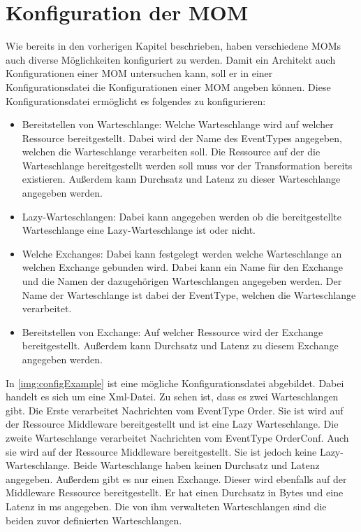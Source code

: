 \section{Konfiguration der MOM}
Wie bereits in den vorherigen Kapitel beschrieben, haben verschiedene MOMs auch diverse Möglichkeiten konfiguriert zu werden. Damit ein Architekt auch Konfigurationen einer MOM untersuchen kann, soll er in einer Konfigurationsdatei die Konfigurationen einer MOM angeben können. Diese Konfigurationsdatei ermöglicht es folgendes zu konfigurieren:
\begin{itemize}
    \item Bereitstellen von Warteschlange: Welche Warteschlange wird auf welcher Ressource bereitgestellt. Dabei wird der Name des EventTypes angegeben, welchen die Warteschlange verarbeiten soll. Die Ressource auf der die Warteschlange bereitgestellt werden soll muss vor der Transformation bereits existieren. Außerdem kann Durchsatz und Latenz zu dieser Warteschlange angegeben werden.
    \item Lazy-Warteschlangen: Dabei kann angegeben werden ob die bereitgestellte Warteschlange eine Lazy-Warteschlange ist oder nicht. 
    \item Welche Exchanges: Dabei kann festgelegt werden welche Warteschlange an welchen Exchange gebunden wird. Dabei kann ein Name für den Exchange und die Namen der dazugehörigen Warteschlangen angegeben werden. Der Name der Warteschlange ist dabei der EventType, welchen die Warteschlange verarbeitet.
    \item Bereitstellen von Exchange: Auf welcher Ressource wird der Exchange bereitgestellt. Außerdem kann Durchsatz und Latenz zu diesem Exchange angegeben werden.
\end{itemize}
In \autoref{img:configExample} ist eine mögliche Konfigurationsdatei abgebildet. Dabei handelt es sich um eine Xml-Datei. Zu sehen ist, dass es zwei Warteschlangen gibt. Die Erste verarbeitet Nachrichten vom EventType Order. Sie ist wird auf der Ressource Middleware bereitgestellt und ist eine Lazy Warteschlange. Die zweite Warteschlange verarbeitet Nachrichten vom EventType OrderConf. Auch sie wird auf der Ressource Middleware bereitgestellt. Sie ist jedoch keine Lazy-Warteschlange. Beide Warteschlange haben keinen Durchsatz und Latenz angegeben. Außerdem gibt es nur einen Exchange. Dieser wird ebenfalls auf der Middleware Ressource bereitgestellt. Er hat einen Durchsatz in Bytes und eine Latenz in ms angegeben. Die von ihm verwalteten Warteschlangen sind die beiden zuvor definierten Warteschlangen.

